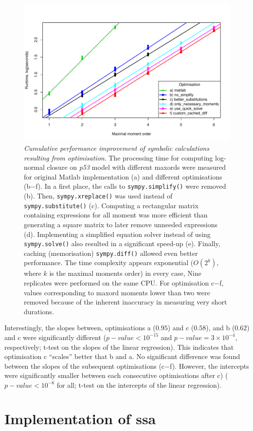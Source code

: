 \documentclass[11pt,a4paper]{article}
\newcommand{\pft}{\textit{p53}}
\begin{document}
\begin{figure}[tbh]
\includegraphics[width=0.95\textwidth{}]{mea_speed.pdf}
\caption{\emph{Cumulative performance improvement of symbolic 
calculations resulting from optimisation}.
The processing time for computing log-normal closure on \pft{} model with different \gls{maxord}s were measured for original Matlab implementation (a) and different optimisations (b$-$f).
In a first place, the calls to \texttt{sympy.simplify()} were removed (b). 
Then, \texttt{sympy.xreplace()} was used instead of \texttt{sympy.substitute()} (c). 
Computing a rectangular matrix containing expressions for all moment was more efficient than generating a square matrix to later remove unneeded expressions (d).
Implementing a simplified equation solver instead of using \texttt{sympy.solve()} also resulted in a significant speed-up (e). 
Finally, caching (memorisation) \texttt{sympy.diff()} allowed even better performance.
The time complexity appears exponential ($O(2^k)$, where $k$ is the maximal moments order) in every case, 
Nine replicates were performed on the same CPU. 
For optimisation c$-$f, values corresponding to \gls{maxord} moments lower than two were removed because of
the inherent inaccuracy in measuring very short durations.}
\label{fig:mea_speed}
\end{figure}

Interestingly, the slopes between, optimisations a ($0.95$) and c ($0.58$), and b ($0.62$) and c were significantly different ($p-value <10^{-15}$ and $p-value = 3 \times 10^{-4}$, respectively;
t-test on the slopes of the linear regression). This indicates that optimisation c ``scales'' better that b and a.
No significant difference was found between the slopes of the subsequent optimisations (c$-$f). 
However, the intercepts were significantly smaller between each consecutive optimisations after c) ($p-value < 10^{-6}$ for all; t-test on the intercepts of the linear regression).




\section{Implementation of \acrlong{ssa}}

\newpage{}
{}

\end{document}
